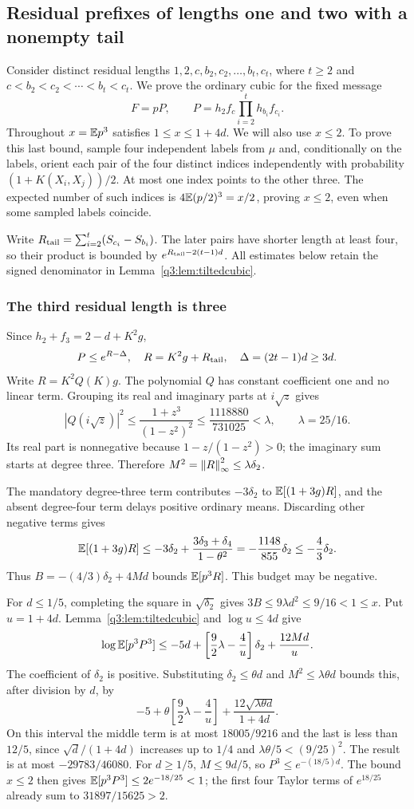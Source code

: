 \subsection{Residual prefixes of lengths one and two with a nonempty tail}\label{q3:app:tails}
Consider distinct residual lengths
$1,2,c,b_2,c_2,\ldots,b_t,c_t$, where $t\ge2$ and
$c<b_2<c_2<\cdots<b_t<c_t$. We prove the ordinary cubic for the fixed message
\[
 F=pP,\qquad P=h_2f_c\prod_{i=2}^t h_{b_i}f_{c_i}.
\]
Throughout $x=\mathbb E p^3$ satisfies $1\le x\le1+4d$. We will also use $x\le2$. To prove this last bound, sample four independent labels from $\mu$ and, conditionally on the labels, orient each pair of the four distinct indices independently with probability $(1+K(X_i,X_j))/2$. At most one index points to the other three. The expected number of such indices is $4\mathbb E(p/2)^3=x/2$, proving $x\le2$, even when some sampled labels coincide.

Write $R_{\rm tail}=\sum_{i=2}^t(S_{c_i}-S_{b_i})$. The later pairs have shorter length at least four, so their product is bounded by $e^{R_{\rm tail}-2(t-1)d}$. All estimates below retain the signed denominator in Lemma~\ref{q3:lem:tiltedcubic}.

\subsubsection{The third residual length is three}
Since $h_2+f_3=2-d+K^2g$,
\[
 P\le e^{R-\Delta},\quad
 R=K^2g+R_{\rm tail},\quad \Delta=(2t-1)d\ge3d.
\]
Write $R=K^2Q(K)g$. The polynomial $Q$ has constant coefficient one and no linear term. Grouping its real and imaginary parts at $i\sqrt z$ gives
\[
 |Q(i\sqrt z)|^2\le\frac{1+z^3}{(1-z^2)^2}
 \le\frac{1118880}{731025}<\lambda,\qquad \lambda=25/16.
\]
Its real part is nonnegative because $1-z/(1-z^2)>0$; the imaginary sum starts at degree three. Therefore $M^2=\left\lVert R\right\rVert_\infty^2\le\lambda \delta_{2}$.

The mandatory degree-three term contributes $-3\delta_{2}$ to $\mathbb E[(1+3g)R]$, and the absent degree-four term delays positive ordinary means. Discarding other negative terms gives
\[
 \mathbb E[(1+3g)R]\le-3\delta_{2}+\frac{3\delta_{3}+\delta_{4}}{1-\theta^2}
 =-\frac{1148}{855}\delta_{2}\le-\frac43\delta_{2}.
\]
Thus $B=-(4/3)\delta_{2}+4Md$ bounds $\mathbb E[p^3R]$. This budget may be negative.

For $d\le1/5$, completing the square in $\sqrt{\delta_{2}}$ gives
$3B\le9\lambda d^2\le9/16<1\le x$. Put $u=1+4d$. Lemma~\ref{q3:lem:tiltedcubic} and $\log u\le4d$ give
\[
 \log\mathbb E[p^3P^3]\le-5d+\left[\frac92\lambda-\frac4u\right]\delta_{2}+\frac{12Md}{u}.
\]
The coefficient of $\delta_{2}$ is positive. Substituting $\delta_{2}\le\theta d$ and $M^2\le\lambda\theta d$ bounds this, after division by $d$, by
\[
 -5+\theta\left[\frac92\lambda-\frac4u\right]
       +\frac{12\sqrt{\lambda\theta d}}{1+4d}.
\]
On this interval the middle term is at most $18005/9216$ and the last is less than $12/5$, since $\sqrt d/(1+4d)$ increases up to $1/4$ and $\lambda\theta/5< (9/25)^2$. The result is at most $-29783/46080$.
For $d\ge1/5$, $M\le9d/5$, so $P^3\le e^{-(18/5)d}$. The bound $x\le2$ then gives
$\mathbb E[p^3P^3]\le2e^{-18/25}<1$; the first four Taylor terms of $e^{18/25}$ already sum to $31897/15625>2$.

